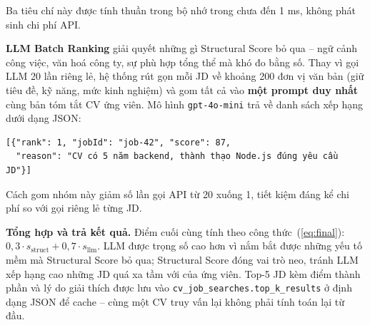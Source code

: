 \documentclass[../DoAn.tex]{subfiles}
\begin{document}
Ba tiêu chí này được tính thuần trong bộ nhớ trong chưa đến 1 ms, không phát sinh chi phí API.

\textbf{LLM Batch Ranking} giải quyết những gì Structural Score bỏ qua -- ngữ cảnh công việc, văn hoá công ty, sự phù hợp tổng thể mà khó đo bằng số. Thay vì gọi LLM 20 lần riêng lẻ, hệ thống rút gọn mỗi JD về khoảng 200 đơn vị văn bản (giữ tiêu đề, kỹ năng, mức kinh nghiệm) và gom tất cả vào \textbf{một prompt duy nhất} cùng bản tóm tắt CV ứng viên. Mô hình \texttt{gpt-4o-mini} trả về danh sách xếp hạng dưới dạng JSON:

\begin{verbatim}
[{"rank": 1, "jobId": "job-42", "score": 87,
  "reason": "CV có 5 năm backend, thành thạo Node.js đúng yêu cầu JD"}]
\end{verbatim}

Cách gom nhóm này giảm số lần gọi API từ 20 xuống 1, tiết kiệm đáng kể chi phí so với gọi riêng lẻ từng JD.

\textbf{Tổng hợp và trả kết quả.} Điểm cuối cùng tính theo công thức~(\ref{eq:final}): $0{,}3 \cdot s_{\text{struct}} + 0{,}7 \cdot s_{\text{llm}}$. LLM được trọng số cao hơn vì nắm bắt được những yếu tố mềm mà Structural Score bỏ qua; Structural Score đóng vai trò neo, tránh LLM xếp hạng cao những JD quá xa tầm với của ứng viên. Top-5 JD kèm điểm thành phần và lý do giải thích được lưu vào \texttt{cv\_job\_searches.top\_k\_results} ở định dạng JSON để cache -- cùng một CV truy vấn lại không phải tính toán lại từ đầu.
\end{document}
